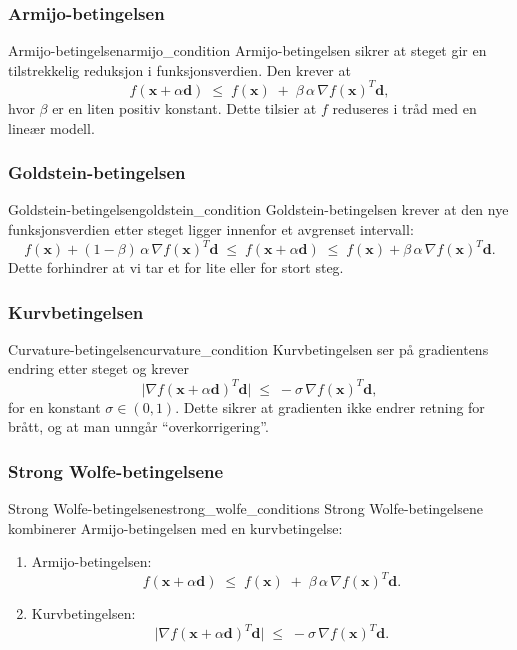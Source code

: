 \subsubsection{Armijo-betingelsen}
\begin{definition}{Armijo-betingelsen}{armijo_condition}
  Armijo-betingelsen sikrer at steget gir en tilstrekkelig reduksjon i funksjonsverdien. Den krever at
  \[
    f(\symbf{x} + \alpha \symbf{d}) 
    \;\le\; 
    f(\symbf{x}) 
    \;+\; 
    \beta\,\alpha\,\nabla f(\symbf{x})^T \symbf{d},
  \]
  hvor \(\beta\) er en liten positiv konstant. Dette tilsier at \(f\) reduseres i tråd med en lineær modell.
\end{definition}

\subsubsection{Goldstein-betingelsen}
\begin{definition}{Goldstein-betingelsen}{goldstein_condition}
  Goldstein-betingelsen krever at den nye funksjonsverdien etter steget ligger innenfor et avgrenset intervall:
  \[
    f(\symbf{x}) + (1-\beta)\,\alpha\,\nabla f(\symbf{x})^T \symbf{d} 
    \;\le\; 
    f(\symbf{x} + \alpha \symbf{d}) 
    \;\le\; 
    f(\symbf{x}) + \beta\,\alpha\,\nabla f(\symbf{x})^T \symbf{d}.
  \]
  Dette forhindrer at vi tar et for lite eller for stort steg.
\end{definition}

\subsubsection{Kurvbetingelsen}
\begin{definition}{Curvature-betingelsen}{curvature_condition}
  Kurvbetingelsen ser på gradientens endring etter steget og krever
  \[
    \bigl|\nabla f(\symbf{x} + \alpha \symbf{d})^T \symbf{d}\bigr| 
    \;\le\; 
    -\sigma \,\nabla f(\symbf{x})^T \symbf{d},
  \]
  for en konstant \(\sigma \in (0,1)\). Dette sikrer at gradienten ikke endrer retning for brått, og at man unngår “overkorrigering”.
\end{definition}

\subsubsection{Strong Wolfe-betingelsene}
\begin{definition}{Strong Wolfe-betingelsene}{strong_wolfe_conditions}
  Strong Wolfe-betingelsene kombinerer Armijo-betingelsen med en kurvbetingelse:
  \begin{enumerate}
    \item Armijo-betingelsen:
          \[
            f(\symbf{x} + \alpha \symbf{d}) 
            \;\le\; 
            f(\symbf{x}) 
            \;+\; 
            \beta\,\alpha\,\nabla f(\symbf{x})^T \symbf{d}.
          \]
    \item Kurvbetingelsen:
          \[
            \bigl|\nabla f(\symbf{x} + \alpha \symbf{d})^T \symbf{d}\bigr| 
            \;\le\; 
            -\sigma \,\nabla f(\symbf{x})^T \symbf{d}.
          \]
  \end{enumerate}
\end{definition}

